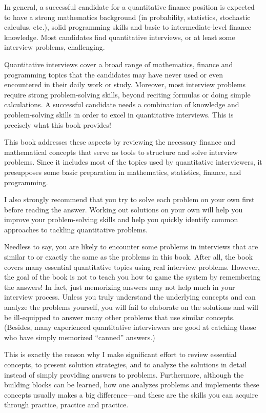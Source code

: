 In general, a successful candidate for a quantitative finance position is expected to have
a strong mathematics background (in probability, statistics, stochastic calculus, etc.),
solid programming skills and basic to intermediate-level finance knowledge. Most
candidates find quantitative interviews, or at least some interview problems, challenging.

Quantitative interviews cover a broad range of mathematics, finance and programming
topics that the candidates may have never used or even encountered in their daily work
or study. Moreover, most interview problems require strong problem-solving skills,
beyond reciting formulas or doing simple calculations. A successful candidate needs a
combination of knowledge and problem-solving skills in order to excel in quantitative
interviews. This is precisely what this book provides!

This book addresses these aspects by reviewing the necessary finance and mathematical
concepts that serve as tools to structure and solve interview problems. Since it includes
most of the topics used by quantitative interviewers, it presupposes some basic
preparation in mathematics, statistics, finance, and programming.

I also strongly recommend that you try to solve each problem on your own first before
reading the answer. Working out solutions on your own will help you improve your
problem-solving skills and help you quickly identify common approaches to tackling
quantitative problems.

Needless to say, you are likely to encounter some problems in interviews that are similar
to or exactly the same as the problems in this book. After all, the book covers many
essential quantitative topics using real interview problems. However, the goal of the
book is not to teach you how to game the system by remembering the answers! In fact,
just memorizing answers may not help much in your interview process. Unless you truly
understand the underlying concepts and can analyze the problems yourself, you will fail
to elaborate on the solutions and will be ill-equipped to answer many other problems
that use similar concepts. (Besides, many experienced quantitative interviewers are good
at catching those who have simply memorized ``canned'' answers.)

This is exactly the reason why I make significant effort to review essential concepts, to
present solution strategies, and to analyze the solutions in detail instead of simply
providing answers to problems. Furthermore, although the building blocks can be
learned, how one analyzes problems and implements these concepts usually makes a big
difference---and these are the skills you can acquire through practice, practice and
practice.

